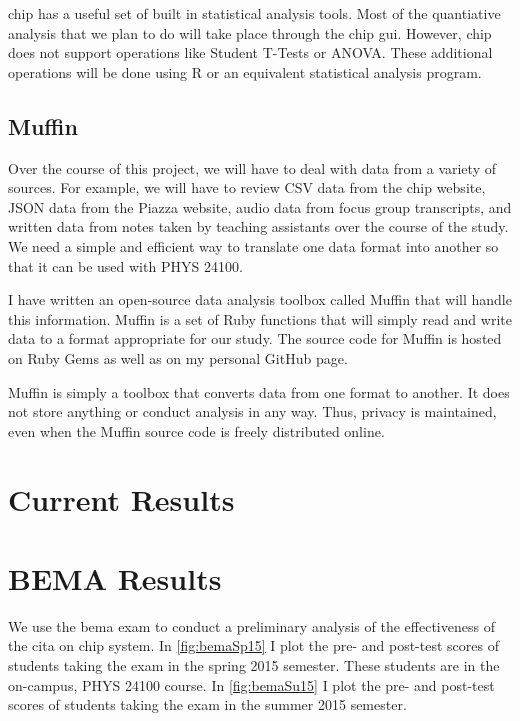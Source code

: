 \gls{chip} has a useful set of built in statistical analysis tools. Most of the quantiative analysis that we plan to do will take place through the \gls{chip} \gls{gui}. However, \gls{chip} does not support operations like Student T-Tests or ANOVA. These additional operations will be done using R or an equivalent statistical analysis program.

\subsection{Muffin}

Over the course of this project, we will have to deal with data from a variety of sources. For example, we will have to review CSV data from the \gls{chip} website, JSON data from the Piazza website, audio data from focus group transcripts, and written data from notes taken by teaching assistants over the course of the study. We need a simple and efficient way to translate one data format into another so that it can be used with PHYS 24100.

I have written an open-source data analysis toolbox called Muffin that will handle this information. Muffin is a set of Ruby functions that will simply read and write data to a format appropriate for our study. The source code for Muffin is hosted on Ruby Gems as well as on my personal GitHub page.

Muffin is simply a toolbox that converts data from one format to another. It does not store anything or conduct analysis in any way. Thus, privacy is maintained, even when the Muffin source code is freely distributed online.

\section{Current Results}

\section{BEMA Results}

We use the \gls{bema} exam to conduct a preliminary analysis of the effectiveness of the \gls{cita} on \gls{chip} system. In \ref{fig:bemaSp15} I plot the pre- and post-test scores of students taking the exam in the spring 2015 semester. These students are in the on-campus, PHYS 24100 course. In \ref{fig:bemaSu15} I plot the pre- and post-test scores of students taking the exam in the summer 2015 semester.

